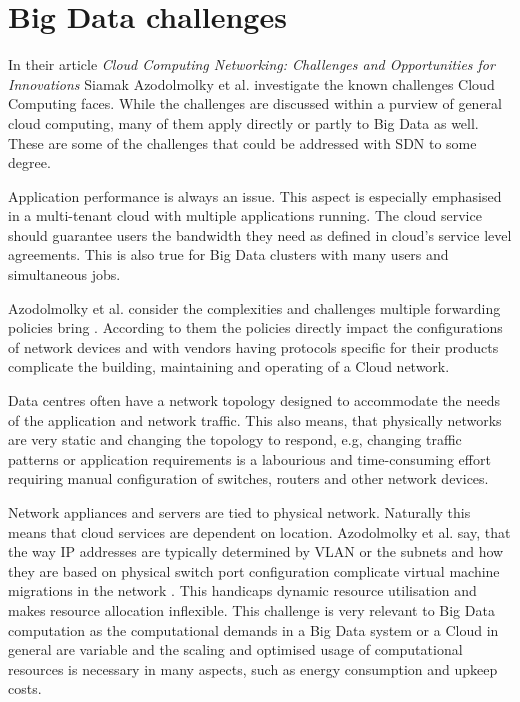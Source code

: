 \documentclass{acm_proc_article-sp}
\begin{document}
\section{Big Data challenges}

In their article \textit{Cloud Computing Networking: Challenges and Opportunities for Innovations} \cite{Azodolmolky} Siamak Azodolmolky et al. investigate the known challenges Cloud Computing faces. While the challenges are discussed within a purview of general cloud computing, many of them apply directly or partly to Big Data as well. These are some of the challenges that could be addressed with SDN to some degree.

Application performance is always an issue. This aspect is especially emphasised in a multi-tenant cloud with multiple applications running. The cloud service should guarantee users the bandwidth they need as defined in cloud's service level agreements. This is also true for Big Data clusters with many users and simultaneous jobs.

Azodolmolky et al. consider the complexities and challenges multiple forwarding policies bring \cite{Azodolmolky}. According to them the policies directly impact the configurations of network devices and with vendors having protocols specific for their products complicate the building, maintaining and operating of a Cloud network.

Data centres often have a network topology designed to accommodate the needs of the application and network traffic. This also means, that physically networks are very static and changing the topology to respond, e.g, changing traffic patterns or application requirements is a labourious and time-consuming effort requiring manual configuration of switches, routers and other network devices.

Network appliances and servers are tied to physical network. Naturally this means that cloud services are dependent on location. Azodolmolky et al. say, that the way IP addresses are typically determined by VLAN or the subnets and how they are based on physical switch port configuration complicate virtual machine migrations in the network \cite{Azodolmolky}. This handicaps dynamic resource utilisation and makes resource allocation inflexible. This challenge is very relevant to Big Data computation as the computational demands in a Big Data system or a Cloud in general are variable and the scaling and optimised usage of computational resources is necessary \cite{Frontiers} in many aspects, such as energy consumption and upkeep costs.
\end{document}
